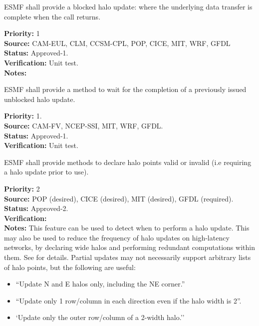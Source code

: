 
ESMF shall provide a blocked halo update: where the underlying
data transfer is complete when the call returns.

\begin{reqlist}
{\bf Priority:} 1 \\
{\bf Source:} CAM-EUL, CLM, CCSM-CPL, POP, CICE, MIT, WRF, GFDL \\
{\bf Status:} Approved-1. \\
{\bf Verification:} Unit test.\\
{\bf Notes:}
\end{reqlist}


ESMF shall provide a method to wait for the completion of a previously
issued unblocked halo update.

\begin{reqlist}
{\bf Priority:} 1. \\ 
{\bf Source:} CAM-FV, NCEP-SSI, MIT, WRF, GFDL. \\
{\bf Status:} Approved-1. \\
{\bf Verification:} Unit test.
\end{reqlist}


ESMF shall provide methods to declare halo points valid or invalid
(i.e requiring a halo update prior to use).

\begin{reqlist}
{\bf Priority:} 2 \\
{\bf Source:} POP (desired), CICE (desired), MIT (desired), GFDL (required). \\
{\bf Status:} Approved-2. \\
{\bf Verification:} \\
{\bf Notes:} This feature can be used to detect when to perform a halo
  update. This may also be used to reduce the frequency of halo
  updates on high-latency networks, by declaring wide halos and
  performing redundant computations within them. See \cite{ref:b2001}
  for details. Partial updates may not necessarily support
  arbitrary lists of halo points, but the following are useful:
  \begin{itemize}
  \item ``Update N and E halos only, including the NE corner.''
  \item ``Update only 1 row/column in each direction even if the halo
    width is 2''.
  \item `Update only the outer row/column of a 2-width halo.''
  \end{itemize}
\end{reqlist}

